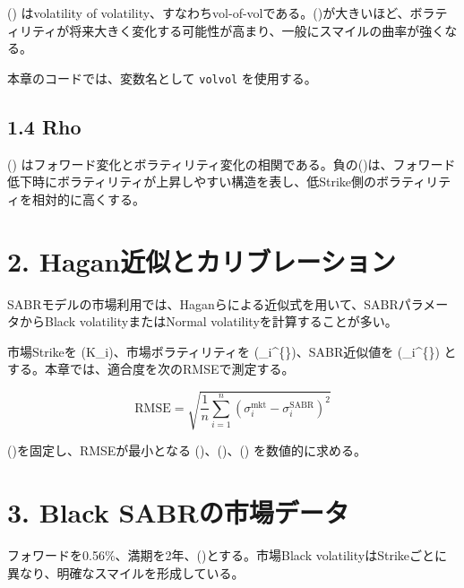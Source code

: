\documentclass[
  letterpaper,
  DIV=11,
  numbers=noendperiod]{scrreprt}
\begin{document}
(\nu) はvolatility of
volatility、すなわちvol-of-volである。(\nu)が大きいほど、ボラティリティが将来大きく変化する可能性が高まり、一般にスマイルの曲率が強くなる。

本章のコードでは、変数名として \texttt{volvol} を使用する。

\subsection{1.4 Rho}\label{rho}

(\rho)
はフォワード変化とボラティリティ変化の相関である。負の(\rho)は、フォワード低下時にボラティリティが上昇しやすい構造を表し、低Strike側のボラティリティを相対的に高くする。

\section{2.
Hagan近似とカリブレーション}\label{haganux8fd1ux4f3cux3068ux30abux30eaux30d6ux30ecux30fcux30b7ux30e7ux30f3}

SABRモデルの市場利用では、Haganらによる近似式を用いて、SABRパラメータからBlack
volatilityまたはNormal volatilityを計算することが多い。

市場Strikeを (K\_i)、市場ボラティリティを
(\sigma\_i\^{}\{\})、SABR近似値を
(\sigma\_i\^{}\{\})
とする。本章では、適合度を次のRMSEで測定する。

\[
\mathrm{RMSE}
=
\sqrt{
\frac{1}{n}
\sum_{i=1}^{n}
\left(
\sigma_i^{\mathrm{mkt}}
-
\sigma_i^{\mathrm{SABR}}
\right)^2
}
\]

(\beta)を固定し、RMSEが最小となる (\alpha)、(\nu)、(\rho)
を数値的に求める。

\section{3. Black
SABRの市場データ}\label{black-sabrux306eux5e02ux5834ux30c7ux30fcux30bf}

フォワードを0.56\%、満期を2年、()とする。市場Black
volatilityはStrikeごとに異なり、明確なスマイルを形成している。
\end{document}
